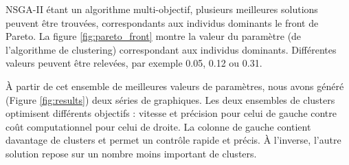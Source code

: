 \documentclass{llncs}
\begin{document}
NSGA-II étant un algorithme multi-objectif, plusieurs meilleures solutions peuvent être trouvées, correspondants aux individus dominants le front de Pareto. La figure \ref{fig:pareto_front} montre la valeur du paramètre (de l'algorithme de clustering) correspondant aux individus dominants. Différentes valeurs peuvent être relevées, par exemple 0.05, 0.12 ou 0.31.


\`A partir de cet ensemble de meilleures valeurs de paramètres, nous avons généré (Figure \ref{fig:results}) deux séries de graphiques. Les deux ensembles de clusters optimisent différents objectifs : vitesse et précision pour celui de gauche contre coût computationnel pour celui de droite. La colonne de gauche contient davantage de clusters et permet un contrôle rapide et précis. \`A l'inverse, l'autre solution repose sur un nombre moins important de clusters.

\end{document}
